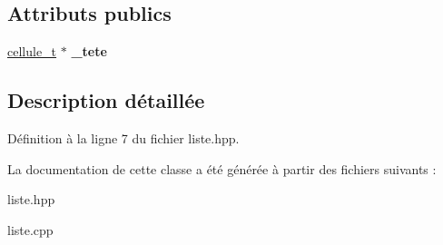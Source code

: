 \subsection*{Attributs publics}
\begin{DoxyCompactItemize}
\item 
\hypertarget{classListe_a203aaf18ff964be5f4bf927a7257e146}{\hyperlink{structcellule}{cellule\+\_\+t} $\ast$ {\bfseries \+\_\+tete}}\label{classListe_a203aaf18ff964be5f4bf927a7257e146}

\end{DoxyCompactItemize}


\subsection{Description détaillée}


Définition à la ligne 7 du fichier liste.\+hpp.



La documentation de cette classe a été générée à partir des fichiers suivants \+:\begin{DoxyCompactItemize}
\item 
liste.\+hpp\item 
liste.\+cpp\end{DoxyCompactItemize}
